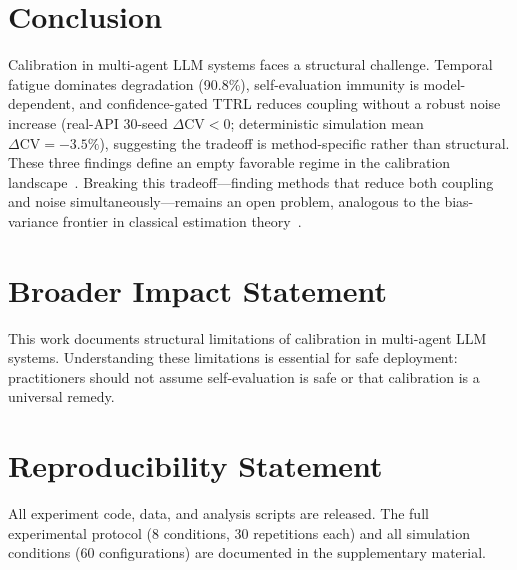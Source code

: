 \documentclass[11pt]{article}
\newcommand{\CV}{\ensuremath{\mathrm{CV}}}
\theoremstyle{definition}
\theoremstyle{remark}
\begin{document}
\section{Conclusion}

Calibration in multi-agent LLM systems faces a structural challenge. Temporal fatigue dominates degradation (90.8\%), self-evaluation immunity is model-dependent, and confidence-gated TTRL reduces coupling without a robust noise increase (real-API 30-seed $\Delta\CV < 0$; deterministic simulation mean $\Delta\CV = -3.5\%$), suggesting the tradeoff is method-specific rather than structural. These three findings define an empty favorable regime in the calibration landscape~\citep{cover2012elements}. Breaking this tradeoff---finding methods that reduce both coupling and noise simultaneously---remains an open problem, analogous to the bias-variance frontier in classical estimation theory~\citep{lehmann1998theory}.

\section*{Broader Impact Statement}

This work documents structural limitations of calibration in multi-agent LLM systems. Understanding these limitations is essential for safe deployment: practitioners should not assume self-evaluation is safe or that calibration is a universal remedy.

\section*{Reproducibility Statement}

All experiment code, data, and analysis scripts are released. The full experimental protocol (8 conditions, 30 repetitions each) and all simulation conditions (60 configurations) are documented in the supplementary material.



\end{document}
